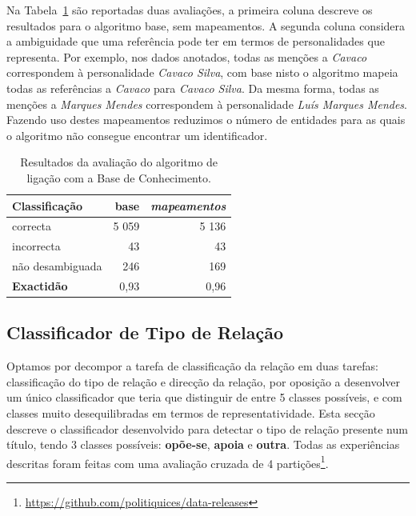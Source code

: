 \documentclass[a4paper, twocolumn, 11pt, twoside]{article}
\begin{document}
Na Tabela~\ref{tab:ent_linking_results} são reportadas duas avaliações, a primeira coluna descreve os resultados para o algoritmo base, sem mapeamentos. A segunda coluna considera a ambiguidade que uma referência pode ter em termos de personalidades que representa. Por exemplo, nos dados anotados, todas as menções a \textit{Cavaco} correspondem à personalidade \textit{Cavaco Silva}, com base nisto o algoritmo mapeia todas as referências a \textit{Cavaco} para \textit{Cavaco Silva}. Da mesma forma, todas as menções a \textit{Marques Mendes} correspondem à personalidade \textit{Luís Marques Mendes}. Fazendo uso destes mapeamentos reduzimos o número de entidades para as quais o algoritmo não consegue encontrar um identificador.

\begin{table}[!h]
    \begin{center}
    \begin{tabular}{l rr}
        {\bf Classificação} & {\bf base} & \it{{\bf mapeamentos}} \\
        \hline
        correcta            &   5 059    &  5 136   \\
        incorrecta          &      43    &     43   \\
		não desambiguada    &     246    &    169   \\    
        \hline
		{\bf Exactidão }    &    0,93	 &  0,96   \\
    \end{tabular}
	\caption{Resultados da avaliação do algoritmo de ligação com a Base de Conhecimento.}
	\label{tab:ent_linking_results}
	\end{center}
\end{table}

\subsection{Classificador de Tipo de Relação}
\label{subsec:rel_classifier}

Optamos por decompor a tarefa de classificação da relação em duas tarefas: classificação do tipo de relação e direcção da relação, por oposição a desenvolver um único classificador que teria que distinguir de entre 5 classes possíveis, e com classes muito desequilibradas em termos de representatividade. Esta secção descreve o classificador desenvolvido para detectar o tipo de relação presente num título, tendo 3 classes possíveis: \textbf{opõe-se}, \textbf{apoia} e \textbf{outra}. Todas as experiências descritas foram feitas com uma avaliação cruzada de 4 partições\footnote{\url{https://github.com/politiquices/data-releases}}.
\end{document}
